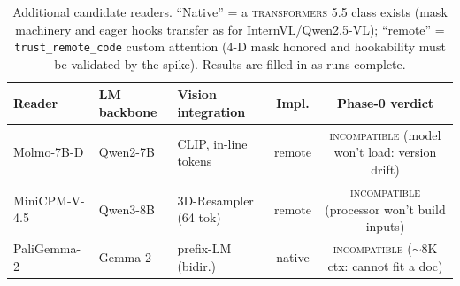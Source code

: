 \documentclass[letterpaper]{article} %
\begin{document}
\begin{table}[t]
\centering
\caption{Additional candidate readers. ``Native'' = a \textsc{transformers} 5.5 class exists (mask machinery and eager
hooks transfer as for InternVL/Qwen2.5-VL); ``remote'' = \texttt{trust\_remote\_code} custom attention (4-D mask honored
and hookability must be validated by the spike). Results are filled in as runs complete.}
\label{tab:additional}
\small
\setlength{\tabcolsep}{5pt}
\begin{tabular}{@{}lllcc@{}}
\toprule
Reader & LM backbone & Vision integration & Impl. & Phase-0 verdict \\
\midrule
Molmo-7B-D    & Qwen2-7B & CLIP, in-line tokens  & remote & \textsc{incompatible} (model won't load: version drift) \\
MiniCPM-V-4.5 & Qwen3-8B & 3D-Resampler (64 tok) & remote & \textsc{incompatible} (processor won't build inputs) \\
PaliGemma-2   & Gemma-2  & prefix-LM (bidir.)    & native & \textsc{incompatible} ($\sim$8K ctx: cannot fit a doc) \\
\bottomrule
\end{tabular}
\end{table}
\end{document}
